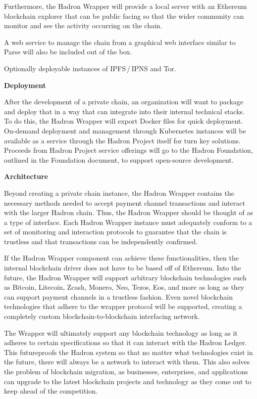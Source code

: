 \documentclass{%
	article}
\begin{document}
Furthermore, the Hadron Wrapper will provide a local server with an Ethereum blockchain explorer that can be public facing so that the wider community can monitor and see the activity occurring on the chain.

A web service to manage the chain from a graphical web interface similar to Parse will also be included out of the box.

Optionally deployable instances of IPFS\,/\,IPNS and Tor.

\begin{center}
\textbf{Deployment}
\end{center}

After the development of a private chain, an organization will want to package and deploy that in a way that can integrate into their internal technical stacks. To do this, the Hadron Wrapper will export Docker files for quick deployment. On-demand deployment and management through Kubernetes instances will be available as a service through the Hadron Project itself for turn key solutions. Proceeds from Hadron Project service offerings will go to the Hadron Foundation, outlined in the Foundation document, to support open-source development.

\begin{center}
\textbf{Architecture}
\end{center}

Beyond creating a private chain instance, the Hadron Wrapper contains the necessary methods needed to accept payment channel transactions and interact with the larger Hadron chain. Thus, the Hadron Wrapper should be thought of as a type of interface. Each Hadron Wrapper instance must adequately conform to a set of monitoring and interaction protocols to guarantee that the chain is trustless and that transactions can be independently confirmed.

If the Hadron Wrapper component can achieve these functionalities, then the internal blockchain driver does not have to be based off of Ethereum. Into the future, the Hadron Wrapper will support arbitrary blockchain technologies such as Bitcoin, Litecoin, Zcash, Monero, Neo, Tezos, Eos, and more as long as they can support payment channels in a trustless fashion. Even novel blockchain technologies that adhere to the wrapper protocol will be supported, creating a completely custom blockchain-to-blockchain interfacing network.

The Wrapper will ultimately support any blockchain technology as long as it adheres to certain specifications so that it can interact with the Hadron Ledger. This futureproofs the Hadron system so that no matter what technologies exist in the future, there will always be a network to interact with them. This also solves the problem of blockchain migration, as businesses, enterprises, and applications can upgrade to the latest blockchain projects and technology as they come out to keep ahead of the competition.
\end{document}
